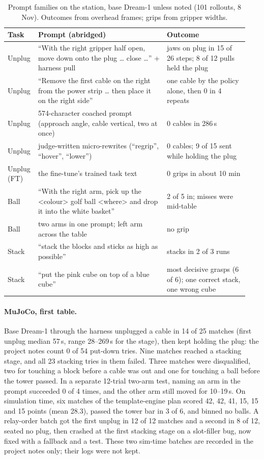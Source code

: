 \documentclass[10pt]{article}
\newcommand{\dream}{Dream-1}
\begin{document}
\begin{table}[t]
\centering
\small
\caption{Prompt families on the station, base \dream{} unless noted (101 rollouts, 8 Nov). Outcomes from overhead frames; grips from
gripper widths.}
\label{tab:prompts}
\begin{tabular}{@{}p{0.09\linewidth}p{0.52\linewidth}p{0.33\linewidth}@{}}
\toprule
Task & Prompt (abridged) & Outcome \\
\midrule
Unplug & ``With the right gripper half open, move down onto the plug \dots{} close \dots'' + harness pull & jaws on plug in 15 of 26 steps; 8 of 12 pulls held the plug \\
Unplug & ``Remove the first cable on the right from the power strip \dots{} then place it on the right side'' & one cable by the policy alone, then 0 in 4 repeats \\
Unplug & 574-character coached prompt (approach angle, cable vertical, two at once) & 0 cables in 286\,s \\
Unplug & judge-written micro-rewrites (``regrip'', ``hover'', ``lower'') & 0 cables; 9 of 15 sent while holding the plug \\
Unplug (FT) & the fine-tune's trained task text & 0 grips in about 10 min \\
Ball & ``With the right arm, pick up the \textless colour\textgreater{} golf ball \textless where\textgreater{} and drop it into the white basket'' & 2 of 5 in; misses were mid-table \\
Ball & two arms in one prompt; left arm across the table & no grip \\
Stack & ``stack the blocks and sticks as high as possible'' & stacks in 2 of 3 runs \\
Stack & ``put the pink cube on top of a blue cube'' & most decisive grasps (6 of 6); one correct stack, one wrong cube \\
\bottomrule
\end{tabular}
\end{table}

\paragraph{MuJoCo, first table.} Base \dream{} through the harness unplugged a cable in 14 of 25 matches (first unplug median 57\,s,
range 28--269\,s for the stage), then kept holding the plug: the project notes count 0 of 54 put-down tries. Nine matches reached a stacking stage,
and all 23 stacking tries in them failed. Three matches were disqualified, two for touching a block before a cable was out and one for touching a ball before the tower passed. In a separate 12-trial two-arm test, naming an arm in the prompt succeeded 0 of 4 times, and the other arm still moved
for 10--19\,s. On simulation time, six matches of the template-engine plan scored 42, 42, 41, 15, 15 and 15 points (mean 28.3), passed the
tower bar in 3 of 6, and binned no balls. A relay-order batch got the first unplug in 12 of 12 matches and a second in 8 of 12, seated no
plug, then crashed at the first stacking stage on a slot-filler bug, now fixed with a fallback and a test. These two sim-time batches are
recorded in the project notes only; their logs were not kept.
\end{document}
